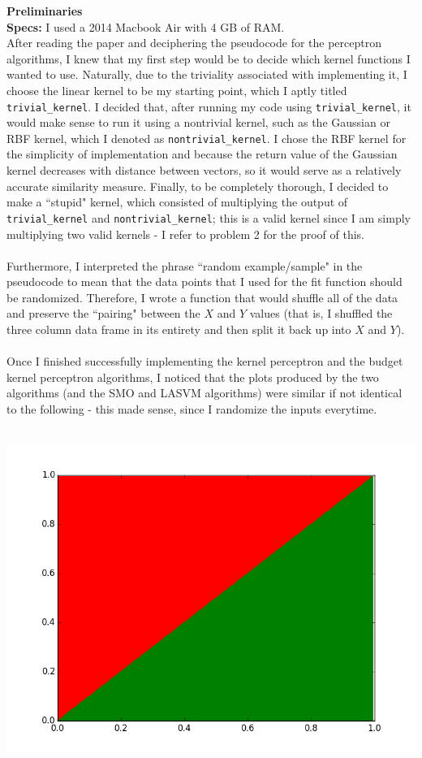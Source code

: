 \documentclass[submit]{harvardml}
\begin{document}
\noindent\textbf{Preliminaries} \\ 
\textbf{Specs:} I used a 2014 Macbook Air with 4 GB of RAM.  \\ 
After reading the paper and deciphering the pseudocode for the perceptron algorithms, I knew that my first step would be to decide which kernel functions I wanted to use. Naturally, due to the triviality associated with implementing it, I choose the linear kernel to be my starting point, which I aptly titled \texttt{trivial\_kernel}. I decided that, after running my code using \texttt{trivial\_kernel}, it would make sense to run it using a nontrivial kernel, such as the Gaussian or RBF kernel, which I denoted as \texttt{nontrivial\_kernel}. I chose the RBF kernel for the simplicity of implementation and because the return value of the Gaussian kernel decreases with distance between vectors, so it would serve as a relatively accurate similarity measure. Finally, to be completely thorough, I decided to make a ``stupid" kernel, which consisted of multiplying the output of \texttt{trivial\_kernel} and \texttt{nontrivial\_kernel}; this is a valid kernel since I am simply multiplying two valid kernels - I refer to problem 2 for the proof of this. \\ \\
Furthermore, I interpreted the phrase ``random example/sample" in the pseudocode to mean that the data points that I used for the fit function should be randomized. Therefore, I wrote a function that would shuffle all of the data and 
preserve the ``pairing" between the $X$ and $Y$ values (that is, I shuffled the three column data frame in its entirety and then split it back up into $X$ and $Y$). \\ \\
Once I finished successfully implementing the kernel perceptron and the budget kernel perceptron algorithms, I noticed that the plots produced by the two algorithms (and the SMO and LASVM algorithms) were similar if not identical to the following - this made sense, since I randomize the inputs everytime. \\ \\
	\centerline{\includegraphics[scale = 0.5]{./k}}
\end{document}
